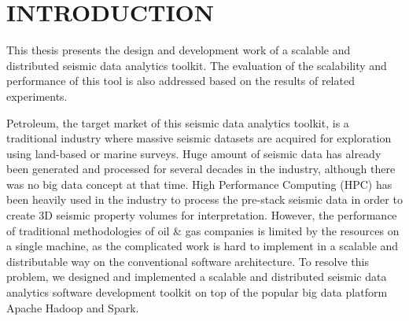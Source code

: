 %
%
%



\pagestyle{plain} %
\setcounter{page}{1}


\chapter{\uppercase {Introduction}}

This thesis presents the design and development work of a scalable and distributed seismic data analytics toolkit.  The evaluation of the scalability and performance of this tool is also addressed based on the results of related experiments.

Petroleum, the target market of this seismic data analytics toolkit, is a traditional industry where massive seismic datasets are acquired for exploration using land-based or marine surveys. Huge amount of seismic data has already been generated and processed for several decades in the industry, although there was no big data concept at that time. High Performance Computing (HPC) has been heavily used in the industry to process the pre-stack seismic data in order to create 3D seismic property volumes for interpretation. However, the performance of traditional methodologies of oil \& gas companies is limited by the resources on a single machine, as the complicated work is hard to implement in a scalable and distributable way on the conventional software architecture. To resolve this problem, we designed and implemented a scalable and distributed seismic data analytics software development toolkit on top of the popular big data platform Apache Hadoop and Spark.



